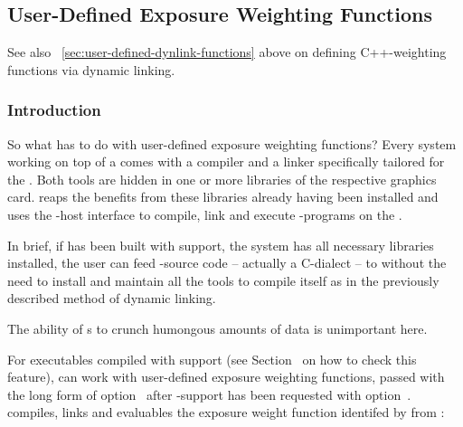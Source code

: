 

\subsection[User-Defined \acronym{OpenCL} Functions]{\label{sec:user-defined-opencl-functions}%
  User-Defined  Exposure Weighting Functions}

See also \sectionName~\ref{sec:user-defined-dynlink-functions} above on defining C++-weighting
functions via dynamic linking.


\subsubsection[Introduction]{\label{sec:user-defined-opencl-functions-introduction}%
  Introduction}

%
%

So what has  to do with user-defined exposure weighting functions?  Every
 system working on top of a  comes with a compiler and a linker
specifically tailored for the .  Both tools are hidden in one or more libraries
of the respective graphics card.  \App{} reaps the benefits from these libraries already having
been installed and uses the -host interface to compile, link and execute
-programs on the .

In brief, if \appcmd{} has been built with  support, the system has all
necessary libraries installed, the user can feed -source code -- actually a
C-dialect -- to \App{} without the need to install and maintain all the tools to compile
\appcmd{} itself as in the previously described method of dynamic linking.

The ability of s to crunch humongous amounts of data is unimportant here.

\noindent{}

%
%
For \App{} executables compiled with  support (see
Section~ on how to check this feature), \App{} can work with
user-defined exposure weighting functions, passed with the long form of
option~ after -support has been requested with
option~.  \App{} compiles, links and evaluables the exposure weight function
identifed by  from :

